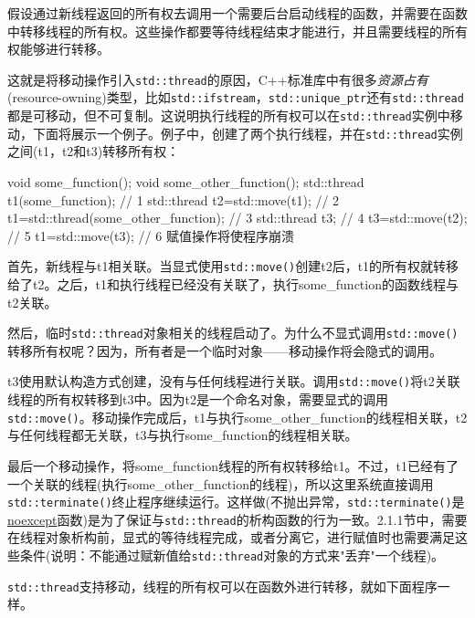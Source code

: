 
假设通过新线程返回的所有权去调用一个需要后台启动线程的函数，并需要在函数中转移线程的所有权。这些操作都要等待线程结束才能进行，并且需要线程的所有权能够进行转移。

这就是将移动操作引入\texttt{std::thread}的原因，C++标准库中有很多\textit{资源占有}(resource-owning)类型，比如\texttt{std::ifstream}，\texttt{std::unique\_ptr}还有\texttt{std::thread}都是可移动，但不可复制。这说明执行线程的所有权可以在\texttt{std::thread}实例中移动，下面将展示一个例子。例子中，创建了两个执行线程，并在\texttt{std::thread}实例之间(t1，t2和t3)转移所有权：

\begin{cpp}
void some_function();
void some_other_function();
std::thread t1(some_function);            // 1
std::thread t2=std::move(t1);            // 2
t1=std::thread(some_other_function);    // 3
std::thread t3;                            // 4
t3=std::move(t2);                        // 5
t1=std::move(t3);                        // 6 赋值操作将使程序崩溃
\end{cpp}

首先，新线程与t1相关联。当显式使用\texttt{std::move()}创建t2后，t1的所有权就转移给了t2。之后，t1和执行线程已经没有关联了，执行some\_function的函数线程与t2关联。

然后，临时\texttt{std::thread}对象相关的线程启动了。为什么不显式调用\texttt{std::move()}转移所有权呢？因为，所有者是一个临时对象——移动操作将会隐式的调用。

t3使用默认构造方式创建，没有与任何线程进行关联。调用\texttt{std::move()}将t2关联线程的所有权转移到t3中。因为t2是一个命名对象，需要显式的调用\texttt{std::move()}。移动操作完成后，t1与执行some\_other\_function的线程相关联，t2与任何线程都无关联，t3与执行some\_function的线程相关联。

最后一个移动操作，将some\_function线程的所有权转移给t1。不过，t1已经有了一个关联的线程(执行some\_other\_function的线程)，所以这里系统直接调用\texttt{std::terminate()}终止程序继续运行。这样做(不抛出异常，\texttt{std::terminate()}是\href{https://en.cppreference.com/w/cpp/language/noexcept}{noexcept}函数)是为了保证与\texttt{std::thread}的析构函数的行为一致。2.1.1节中，需要在线程对象析构前，显式的等待线程完成，或者分离它，进行赋值时也需要满足这些条件(说明：不能通过赋新值给\texttt{std::thread}对象的方式来"丢弃"一个线程)。

\texttt{std::thread}支持移动，线程的所有权可以在函数外进行转移，就如下面程序一样。

